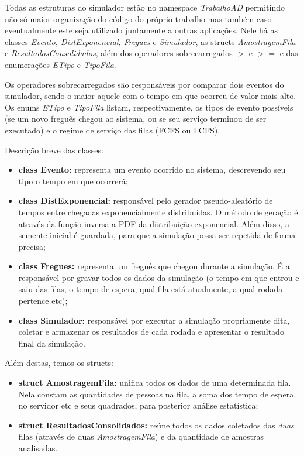 \documentclass[a4paper,10pt]{article}
\begin{document}
    Todas as estruturas do simulador estão no namespace \emph{TrabalhoAD} permitindo não só maior organização do código do próprio trabalho mas também caso eventualmente este seja utilizado juntamente a outras aplicações. Nele há as classes \emph{Evento, DistExponencial, Fregues} e \emph{Simulador}, as structs \emph{AmostragemFila} e \emph{ResultadosConsolidados}, além dos operadores sobrecarregados \emph{$>$} e \emph{$>=$} e das enumerações \emph{ETipo} e \emph{TipoFila}.

    Os operadores sobrecarregados são responsáveis por comparar dois eventos do simulador, sendo o maior aquele com o tempo em que ocorreu de valor mais alto. Os enums \emph{ETipo} e \emph{TipoFila} listam, respectivamente, os tipos de evento possíveis (se um novo freguês chegou ao sistema, ou se seu serviço terminou de ser executado) e o regime de serviço das filas (FCFS ou LCFS).

    Descrição breve das classes:

\begin {itemize}
\item \textbf{class Evento:} representa um evento ocorrido no sistema, descrevendo seu tipo o tempo em que ocorrerá;

\item \textbf{class DistExponencial:} responsável pelo gerador pseudo-aleatório de tempos entre chegadas exponencialmente distribuídas. O método de geração é através da função inversa a PDF da distribuição exponencial. Além disso, a semente inicial é guardada, para que a simulação possa ser repetida de forma precisa;

\item \textbf{class Fregues:} representa um freguês que chegou durante a simulação. É a responsável por gravar todos os dados da simulação (o tempo em que entrou e saiu das filas, o tempo de espera, qual fila está atualmente, a qual rodada pertence etc);

\item \textbf{class Simulador:} responsável por executar a simulação propriamente dita, coletar e armazenar os resultados de cada rodada e apresentar o resultado final da simulação.
\end {itemize}

    Além destas, temos os structs:

\begin {itemize}
\item \textbf{struct AmostragemFila:} unifica todos os dados de uma determinada fila. Nela constam as quantidades de pessoas na fila, a soma dos tempo de espera, no servidor etc e seus quadrados, para posterior análise estatística;

\item \textbf{struct ResultadosConsolidados:} reúne todos os dados coletados das \emph{duas} filas (através de duas \emph{AmostragemFila}) e da quantidade de amostras analisadas.
\end {itemize}
\end{document}
